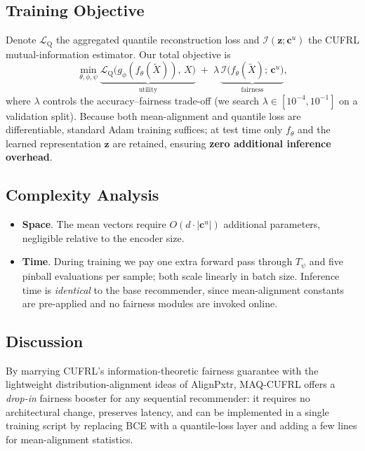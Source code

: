 \documentclass{article}
\begin{document}
\subsection{Training Objective}
\label{ssec:objective}
Denote $\mathcal L_{\text{Q}}$ the aggregated quantile reconstruction loss and
$\mathcal I(\mathbf z;\mathbf c^{u})$ the CUFRL mutual-information estimator.
Our total objective is
\[
    \min_{\theta,\phi,\psi}
        \underbrace{\mathcal L_{\text{Q}}
        \bigl(g_\phi(f_\theta(\tilde{X})),\,X\bigr)}_{\text{utility}}
        \;+\;
        \lambda\,
        \underbrace{\mathcal I\bigl(f_\theta(\tilde{X});\,\mathbf c^{u}\bigr)}_{\text{fairness}},
\]
where $\lambda$ controls the accuracy–fairness trade-off
(we search $\lambda\!\in\![10^{-4},10^{-1}]$ on a validation split).
Because both mean-alignment and quantile loss are differentiable,
standard Adam training suffices; at test time only $f_\theta$ and the
learned representation $\mathbf z$ are retained, ensuring \textbf{zero
additional inference overhead}.

\subsection{Complexity Analysis}
\label{ssec:complexity}
\begin{itemize}
\item \textbf{Space}.  The mean vectors require
$O(d\!\cdot\!\lvert\mathbf c^{u}\rvert)$ additional parameters, negligible
relative to the encoder size.
\item \textbf{Time}.  During training we pay one extra forward pass through
$T_\psi$ and five pinball evaluations per sample; both scale linearly in
batch size.  Inference time is \emph{identical} to the base recommender,
since mean-alignment constants are pre-applied and no fairness modules are
invoked online.
\end{itemize}

\subsection{Discussion}
\label{ssec:discussion}
By marrying CUFRL’s information-theoretic fairness guarantee with the
lightweight distribution-alignment ideas of AlignPxtr, MAQ-CUFRL offers a
\emph{drop-in} fairness booster for any sequential recommender: it requires
no architectural change, preserves latency, and can be implemented in a
single training script by replacing BCE with a quantile‐loss layer and
adding a few lines for mean-alignment statistics.
\end{document}
